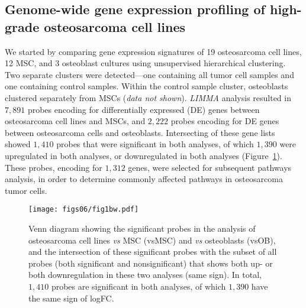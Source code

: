 \subsection{Genome\hyp{}wide gene expression profiling of high\hyp{}grade osteosarcoma cell lines}
We started by comparing gene expression signatures of 19 osteosarcoma cell lines, 12 MSC, and 3 osteoblast cultures using unsupervised hierarchical clustering. Two separate clusters were detected---one containing all tumor cell samples and one containing control samples. Within the control sample cluster, osteoblasts clustered separately from MSCs ({\it data not shown}). {\it  LIMMA} analysis resulted in $7,891$ probes encoding for differentially expressed (DE) genes between osteosarcoma cell lines and MSCs, and $2,222$ probes encoding for DE genes between osteosarcoma cells and osteoblasts. Intersecting of these gene lists showed $1,410$ probes that were significant in both analyses, of which $1,390$ were upregulated in both analyses, or downregulated in both analyses (Figure~\ref{fig6.1}). These probes, encoding for $1,312$ genes, were selected for subsequent pathways analysis, in order to determine commonly affected pathways in osteosarcoma tumor cells.
%
\begin{figure}[htbp]
  \centering
  \begin{minipage}[b]{0.50\linewidth}
    \texttt{[image: figs06/fig1bw.pdf]}		%
  \end{minipage}
    \hfill
  \begin{minipage}[b]{0.46\linewidth}
     \caption{Venn diagram showing the significant probes in the analysis of osteosarcoma cell lines {\it vs} MSC (vsMSC) and {\it vs} osteoblasts (vsOB), and the intersection of these significant probes with the subset of all probes (both significant and nonsignificant) that shows both up- or both downregulation in these two analyses (same sign). In total, $1,410$ probes are significant in both analyses, of which $1,390$ have the same sign of logFC.}
     \label{fig6.1}
     \end{minipage}
\end{figure}
%

